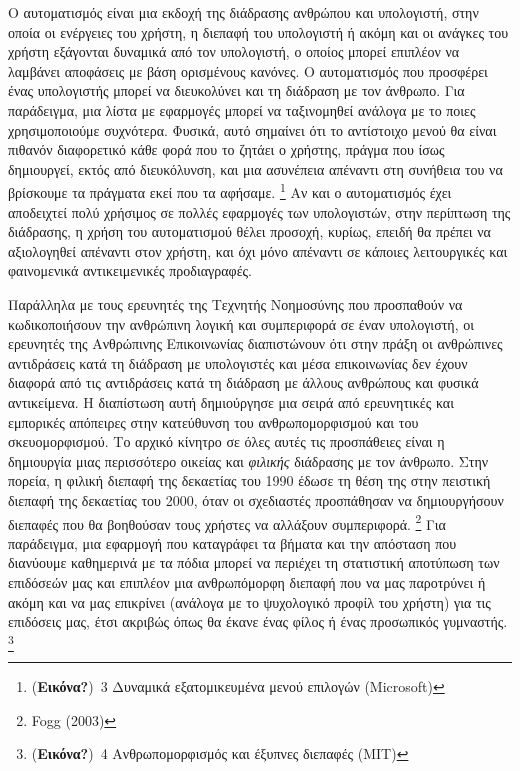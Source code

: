\documentclass[
]{article}
\begin{document}
Ο αυτοματισμός είναι μια εκδοχή της διάδρασης ανθρώπου και υπολογιστή,
στην οποία οι ενέργειες του χρήστη, η διεπαφή του υπολογιστή ή ακόμη και
οι ανάγκες του χρήστη εξάγονται δυναμικά από τον υπολογιστή, ο οποίος
μπορεί επιπλέον να λαμβάνει αποφάσεις με βάση ορισμένους κανόνες. Ο
αυτοματισμός που προσφέρει ένας υπολογιστής μπορεί να διευκολύνει και τη
διάδραση με τον άνθρωπο. Για παράδειγμα, μια λίστα με εφαρμογές μπορεί
να ταξινομηθεί ανάλογα με το ποιες χρησιμοποιούμε συχνότερα. Φυσικά,
αυτό σημαίνει ότι το αντίστοιχο μενού θα είναι πιθανόν διαφορετικό κάθε
φορά που το ζητάει ο χρήστης, πράγμα που ίσως δημιουργεί, εκτός από
διευκόλυνση, και μια ασυνέπεια απέναντι στη συνήθεια του να βρίσκουμε τα
πράγματα εκεί που τα αφήσαμε. \footnote{(\textbf{Εικόνα?})~3 Δυναμικά
  εξατομικευμένα μενού επιλογών (Microsoft)} Αν και ο αυτοματισμός έχει
αποδειχτεί πολύ χρήσιμος σε πολλές εφαρμογές των υπολογιστών, στην
περίπτωση της διάδρασης, η χρήση του αυτοματισμού θέλει προσοχή, κυρίως,
επειδή θα πρέπει να αξιολογηθεί απέναντι στον χρήστη, και όχι μόνο
απέναντι σε κάποιες λειτουργικές και φαινομενικά αντικειμενικές
προδιαγραφές.

Παράλληλα με τους ερευνητές της Τεχνητής Νοημοσύνης που προσπαθούν να
κωδικοποιήσουν την ανθρώπινη λογική και συμπεριφορά σε έναν υπολογιστή,
οι ερευνητές της Ανθρώπινης Επικοινωνίας διαπιστώνουν ότι στην πράξη οι
ανθρώπινες αντιδράσεις κατά τη διάδραση με υπολογιστές και μέσα
επικοινωνίας δεν έχουν διαφορά από τις αντιδράσεις κατά τη διάδραση με
άλλους ανθρώπους και φυσικά αντικείμενα. Η διαπίστωση αυτή δημιούργησε
μια σειρά από ερευνητικές και εμπορικές απόπειρες στην κατεύθυνση του
ανθρωπομορφισμού και του σκευομορφισμού. Το αρχικό κίνητρο σε όλες αυτές
τις προσπάθειες είναι η δημιουργία μιας περισσότερο οικείας και
\emph{φιλικής} διάδρασης με τον άνθρωπο. Στην πορεία, η φιλική διεπαφή
της δεκαετίας του 1990 έδωσε τη θέση της στην πειστική διεπαφή της
δεκαετίας του 2000, όταν οι σχεδιαστές προσπάθησαν να δημιουργήσουν
διεπαφές που θα βοηθούσαν τους χρήστες να αλλάξουν συμπεριφορά.
\footnote{Fogg (2003)} Για παράδειγμα, μια εφαρμογή που καταγράφει τα
βήματα και την απόσταση που διανύουμε καθημερινά με τα πόδια μπορεί να
περιέχει τη στατιστική αποτύπωση των επιδόσεών μας και επιπλέον μια
ανθρωπόμορφη διεπαφή που να μας παροτρύνει ή ακόμη και να μας επικρίνει
(ανάλογα με το ψυχολογικό προφίλ του χρήστη) για τις επιδόσεις μας, έτσι
ακριβώς όπως θα έκανε ένας φίλος ή ένας προσωπικός γυμναστής.
\footnote{(\textbf{Εικόνα?})~4 Ανθρωπομορφισμός και έξυπνες διεπαφές
  (MIT)}
\end{document}
